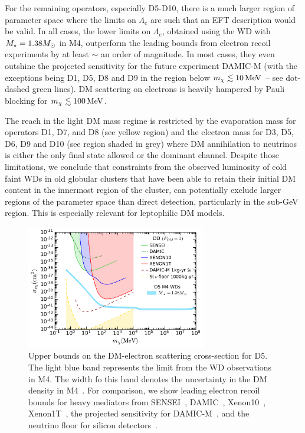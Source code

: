 For the remaining operators, especially D5-D10, there is a much larger region of parameter space where the limits on $\Lambda_e$ are such that an EFT description would be valid. In all cases, the lower limits on $\Lambda_e$, obtained using the WD with $M_\star=1.38M_\odot$ in M4, outperform the leading bounds from electron recoil experiments by at least $\sim$ an order of magnitude.  In most cases, they even outshine the projected sensitivity for the future experiment DAMIC-M (with the exceptions being D1, D5, D8 and D9 in the region below $m_\chi\lesssim10{\rm \,MeV}$ -- see dot-dashed green lines). DM scattering on electrons
is heavily hampered by Pauli blocking for  $m_\chi\lesssim100{\rm \,MeV}$.  

The reach in the light DM mass regime is restricted by the evaporation mass for operators D1, D7, and D8 (see yellow region) and the electron mass for D3, D5, D6, D9 and D10 (see region shaded in grey) where DM annihilation to neutrinos is either the only final state allowed or the dominant channel.  Despite those limitations, we conclude that constraints from the observed luminosity of cold faint WDs in old globular clusters that have been able to retain their initial DM content in the innermost region of the cluster, can potentially exclude larger regions of the parameter space than direct detection, particularly in the sub-GeV region. This is especially relevant for leptophilic DM models.

\begin{figure}
    \centering
  \includegraphics[width=0.7\textwidth]{wd_capture/DD_WD_electrons_D5.pdf}
    \caption{Upper bounds on the DM-electron scattering cross-section for D5. The light blue band represents the limit from the WD observations in M4. The width fo this band denotes the uncertainty in the DM density in M4~\cite{McCullough:2010ai_CaptureInelasticDark}.  
     For comparison, we show leading electron recoil bounds for heavy mediators from SENSEI~\cite{SENSEI:2020dpa_oct_SENSEIDirectDetectionResults}, DAMIC~\cite{DAMIC:2019dcn_Constraintslightdark}, Xenon10~\cite{Essig:2017kqs_Newconstraintsprospects}, Xenon1T~\cite{XENON:2019gfn_Lightdarkmatter}, the projected sensitivity for DAMIC-M~\cite{Essig:2015cda_DirectdetectionsubGeV}, and the neutrino floor for silicon detectors~\cite{Essig:2018tss_Solarneutrinossignal}. 
    }
    \label{ch4:fig:D5sigmalimit}
\end{figure}


